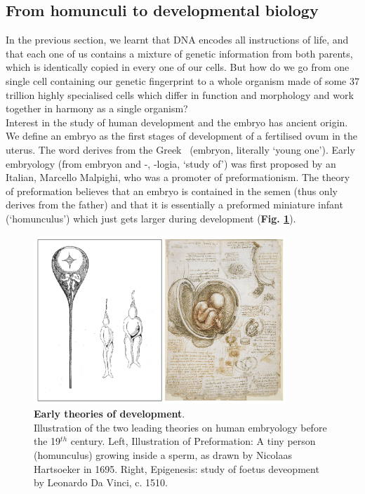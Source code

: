 \newpage

\subsection{From homunculi to developmental biology}
\label{sec:history_developmental_biology}

In the previous section, we learnt that DNA encodes all instructions of life, and that each one of us contains a mixture of genetic information from both parents, which is identically copied in every one of our cells.
But how do we go from one single cell containing our genetic fingerprint to a whole organism made of some 37 trillion highly specialised cells which differ in function and morphology and work together in harmony as a single organism?\\

Interest in the study of human development and the embryo has ancient origin.
We define an embryo as the first stages of development of a fertilised ovum in the uterus.
The word derives from the Greek \textepsilon\textmu\textbeta\textrho\textupsilon\textomikron\textnu \ (embryon, literally `young one').
Early embryology (from embryon and -\textlambda\textomikron\textgamma\textiota\textalpha, -logia, `study of') was first proposed by an Italian, Marcello Malpighi, 
who was a promoter of 
preformationism.
The theory of preformation believes that an embryo is contained in the semen (thus only derives from the father) and that it is essentially a preformed miniature infant (`homunculus') which just gets larger 
during development (\textbf{Fig. \ref{fig:early_embryology}}).\\

\begin{figure}
\includegraphics[width=9.5cm]{Chapter1/Fig/Early_theories_development.png}
\caption[Early theories of development]{\textbf{Early theories of development}.\\
Illustration of the two leading theories on human embryology before the 19$^{th}$ century.
Left, Illustration of Preformation: 
A tiny person (homunculus) growing inside a sperm, as drawn by Nicolaas Hartsoeker in 1695.
Right, Epigenesis: study of foetus deveopment by Leonardo Da Vinci, c. 1510.}
\label{fig:early_embryology}
\end{figure}

